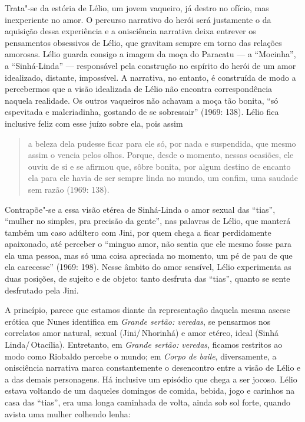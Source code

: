 {Trata"-se da estória de Lélio, um jovem vaqueiro, já destro no ofício,
mas inexperiente no amor. O percurso narrativo do herói será
justamente o da aquisição dessa experiência e a onisciência narrativa
deixa entrever os pensamentos obsessivos de Lélio, que gravitam
sempre em torno das relações amorosas. Lélio guarda consigo a imagem
da moça do Paracatu --- a “Mocinha”, a “Sinhá-Linda” --- responsável pela
construção no espírito do herói de um amor idealizado, distante,
impossível. A narrativa, no entanto, é construída de modo a
percebermos que a visão idealizada de Lélio não encontra
correspondência naquela realidade. Os outros vaqueiros não achavam a
moça tão bonita, “só espevitada e malcriadinha, gostando de se
sobressair” (1969: 138). Lélio fica inclusive feliz com esse juízo
sobre ela, pois assim

\begin{quote}
a beleza dela pudesse ficar para ele só, por nada e suspendida, que
mesmo assim o vencia pelos olhos. Porque, desde o momento, nessas
ocasiões, ele ouviu de si e se afirmou que, sôbre bonita, por algum
destino de encanto ela para ele havia de ser sempre linda no mundo,
um confim, uma saudade sem razão (1969: 138). 
\end{quote}

Contrapõe"-se a essa visão etérea de Sinhá-Linda o amor sexual das
“tias”, “mulher no simples, pra precisão da gente”, nas palavras de
Lélio, que manterá também um caso adúltero com Jini, por quem chega a
ficar perdidamente apaixonado, até perceber o “minguo amor, não
sentia que ele mesmo fosse para ela uma pessoa, mas só uma coisa
apreciada no momento, um pé de pau de que ela carecesse” (1969: 198).
Nesse âmbito do amor sensível, Lélio experimenta as duas posições, de
sujeito e de objeto: tanto desfruta das “tias”, quanto se sente
desfrutado pela Jini.

A princípio, parece que estamos diante da representação daquela mesma
ascese erótica que Nunes identifica em \emph{Grande sertão:
veredas}, se pensarmos nos correlatos amor natural, sexual
(Jini/\,Nhorinhá) e amor etéreo, ideal (Sinhá Linda/\,Otacília).
Entretanto, em \emph{Grande sertão: veredas}, ficamos restritos ao
modo como Riobaldo percebe o mundo; em \emph{Corpo de baile},
diversamente, a onisciência narrativa marca constantemente o
desencontro entre a visão de Lélio e a das demais personagens. Há
inclusive um episódio que chega a ser jocoso. Lélio estava voltando
de um daqueles domingos de comida, bebida, jogo e carinhos na casa
das “tias”, era uma longa caminhada de volta, ainda sob sol forte,
quando avista uma mulher colhendo lenha:

}
